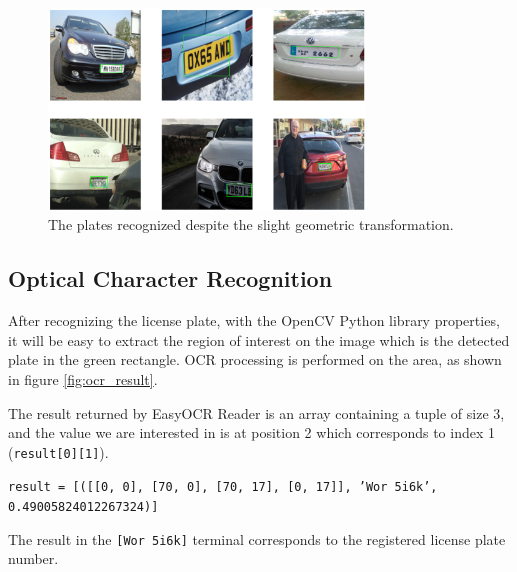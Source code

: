 \documentclass[lnbip]{svmultln}
\begin{document}
	
	

	\begin{figure}[H]%
		\centering
		\includegraphics[width=0.75\textwidth]{images/predicted_trans_image_1}
		\caption{The plates recognized despite the slight geometric transformation.}
		\label{fig:predicted_trans_image_1}
	\end{figure}

	\subsection{Optical Character Recognition}
	
	After recognizing the license plate,
	with the OpenCV Python library properties, it will be easy to extract the region of interest on the image which is the detected plate in the green rectangle. OCR processing is performed on the area, as shown in figure \ref{fig:ocr_result}.
	
	The result returned by EasyOCR Reader is an array containing a tuple of size 3, and the value we are interested in is at position 2 which corresponds to index 1 (\texttt{result[0][1]}).
	
	\noindent\texttt{result = [([[0, 0], [70, 0], [70, 17], [0, 17]], 'Wor 5i6k', 0.49005824012267324)]}
	
	\noindent The result in the \texttt{[Wor 5i6k]} terminal corresponds to the registered license plate number.
\end{document}
